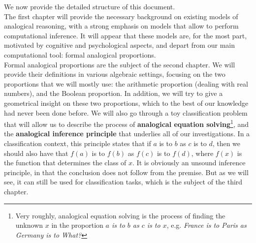 We now provide the detailed structure of this document.\\

The first chapter will provide the necessary background on existing
models of analogical reasoning, with a strong emphasis on models that allow to
perform computational inference. It will appear that these models are, for the
most part, motivated by cognitive and psychological aspects, and depart from
our main computational tool: formal analogical proportions.\\

Formal analogical proportions are the subject of the second chapter. We will
provide their definitions in various algebraic settings,
focusing on the two proportions that we will mostly use: the arithmetic
proportion (dealing with real numbers), and the Boolean proportion. In
addition, we will try to give a geometrical insight on these two proportions,
which to the best of our knowledge had never been
done before. We will also go through a toy classification problem that will
allow us to describe the process of \textbf{analogical equation
solving}\footnote{Very roughly, analogical equation solving is the process of
finding the unknown $x$ in the proportion \textit{$a$ is to $b$ as $c$ is to
$x$}, e.g. \textit{France is to Paris as Germany is to What?}}, and the
\textbf{analogical inference principle} that underlies all
of our investigations. In a classification context, this
principle states that if $a$ is to $b$ as $c$ is to $d$,
then we should also have that $f(a)$ is to $f(b)$ as $f(c)$ is to $f(d)$, where
$f(x)$ is the function that determines the class of $x$. It is obviously an
unsound inference principle, in that the conclusion does not follow from the
premise. But as we will see, it can still be used for classification tasks,
which is the subject of the third chapter.\\

